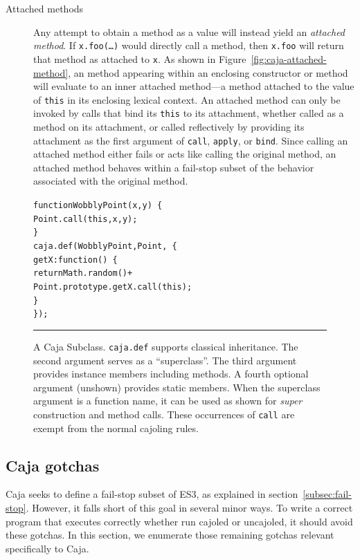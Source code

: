 \documentclass[letterpaper,twocolumn,10pt]{article}
\newcommand{\code}[1]{{\tt {#1}}}              %
\begin{document}
\begin{description}
   \item[Attached methods] Any attempt to obtain a method as a value will 
   instead yield an \emph{attached method}. If \code{x.foo(\ldots)} would 
   directly call a method, then \code{x.foo} will return that method as 
   attached to \code{x}. As shown in Figure~\ref{fig:caja-attached-method}, an 
   method appearing within an enclosing constructor or method will evaluate 
   to an inner attached method---a method attached to the value of \code{this} in its enclosing lexical context. 
   An attached method can only be invoked by calls that bind its \code{this} 
   to its attachment, whether called as a method on its attachment, or called 
   reflectively by providing its attachment as the first argument of 
   \code{call}, \code{apply}, or \code{bind}. Since calling an attached 
   method either fails or acts like calling the original method, an attached 
   method behaves within a fail-stop subset of the behavior associated with the original method.
  
\end{description}

\begin{figure}[t!]
\begin{alltt}
function WobblyPoint(x, y)\ \{
  Point.call(this, x, y);
\}
caja.def(WobblyPoint, Point,\ \{
  getX: function()\ \{ 
    return Math.random() +
      Point.prototype.getX.call(this); 
  \}
\});
\end{alltt}

\caption[A Caja Subclass.]{A Caja Subclass. \code{caja.def} supports 
classical inheritance. The second argument serves as a ``superclass''. The 
third argument provides instance members including methods. A fourth optional 
argument (unshown) provides static members. When the superclass argument is a 
function name, it can be used as shown for \emph{super} construction and 
method calls. These occurrences of \code{call} are exempt from the normal 
cajoling rules. \\ } \hrule
\label{fig:caja-subclass}
\end{figure}


\subsection{Caja gotchas}
\label{subsec:caja-gotchas}

Caja seeks to define a fail-stop subset of ES3, as explained in section~\ref{subsec:fail-stop}. However, 
it falls short of this goal in several minor ways. To write a correct program 
that executes correctly whether run cajoled or uncajoled, it should 
avoid these gotchas. In this section, we enumerate those remaining gotchas
relevant specifically to Caja.
\end{document}
